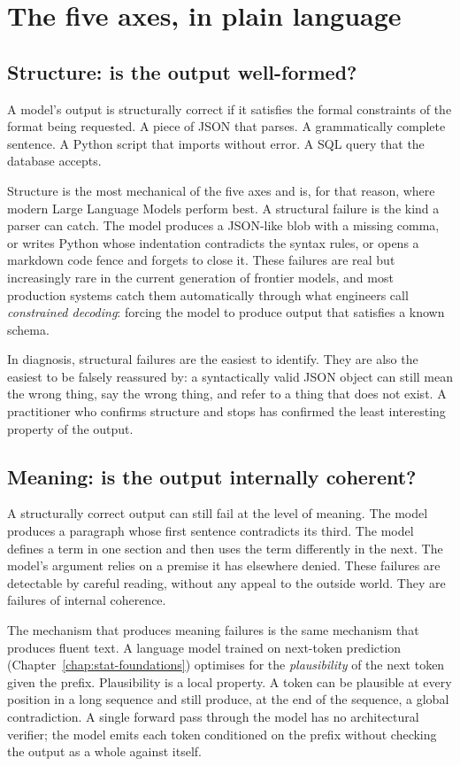 \section{The five axes, in plain language}

\subsection*{Structure: is the output well-formed?}

A model's output is structurally correct if it satisfies the
formal constraints of the format being requested. A piece of
JSON that parses. A grammatically complete sentence. A
Python script that imports without error. A SQL query that
the database accepts.

Structure is the most mechanical of the five axes and is, for
that reason, where modern Large Language Models perform best.
A structural failure is the kind a parser can catch. The
model produces a JSON-like blob with a missing comma, or
writes Python whose indentation contradicts the syntax rules,
or opens a markdown code fence and forgets to close it.
These failures are real but increasingly rare in the current
generation of frontier models, and most production systems
catch them automatically through what engineers call
\emph{constrained decoding}: forcing the model to produce
output that satisfies a known schema.

In diagnosis, structural failures are the easiest to identify.
They are also the easiest to be falsely reassured by: a
syntactically valid JSON object can still mean the wrong
thing, say the wrong thing, and refer to a thing that does
not exist. A practitioner who confirms structure and stops has
confirmed the least interesting property of the output.

\subsection*{Meaning: is the output internally coherent?}

A structurally correct output can still fail at the level of
meaning. The model produces a paragraph whose first sentence
contradicts its third. The model defines a term in one
section and then uses the term differently in the next. The
model's argument relies on a premise it has elsewhere denied.
These failures are detectable by careful reading, without any
appeal to the outside world. They are failures of internal
coherence.

The mechanism that produces meaning failures is the same
mechanism that produces fluent text. A language model trained
on next-token prediction (Chapter~\ref{chap:stat-foundations}) optimises for the
\emph{plausibility} of the next token given the prefix.
Plausibility is a local property. A token can be plausible at
every position in a long sequence and still produce, at the
end of the sequence, a global contradiction. A single
forward pass through the model has no architectural verifier;
the model emits each token conditioned on the prefix without
checking the output as a whole against itself.

